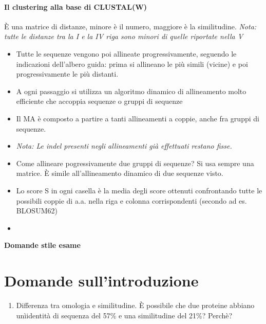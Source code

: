 \documentclass{article}
\begin{document}
\paragraph{Il clustering alla base di CLUSTAL(W)} È una matrice di distanze, minore è il numero, maggiore è la similitudine.
\textit{Nota: tutte le distanze tra la I e la IV riga sono minori di quelle riportate nella V}
\begin{itemize}
    \item Tutte le sequenze vengono poi allineate progressivamente, seguendo le indicazioni dell'albero
    guida: prima si allineano le più simili (vicine) e poi progressivamente le più distanti.
    \item A ogni passaggio si utilizza un algoritmo dinamico di allineamento molto efficiente che accoppia sequenze o gruppi di sequenze
    \item Il MA è composto a partire a tanti allineamenti a coppie, anche fra gruppi di sequenze.
    \item{} \textit{Nota: Le indel presenti negli allineamenti già effettuati restano fisse.}
    \item Come allineare pogressivamente due gruppi di sequenze? Si usa sempre una matrice. È simile all'allineamento dinamico di due sequenze visto.
    \item Lo score S in ogni
    casella è la media degli score ottenuti confrontando tutte le possibili coppie di a.a. nella riga e colonna
    corrispondenti (secondo ad es. BLOSUM62)
    \item 
\end{itemize}


\begin{titlepage}
    \begin{center}
        \vspace*{1cm}
        \LARGE
        \textbf{Domande stile esame}

    \end{center}
\end{titlepage}

\section{Domande sull'introduzione}
\Large
\begin{enumerate}
    \item Differenza tra omologia e similitudine. È possibile che due proteine abbiano unìidentità di sequenza del 57\% e una similitudine del 21\%? Perchè?
\end{enumerate}
\end{document}
